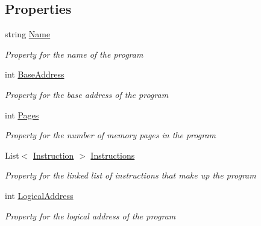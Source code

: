 \subsection*{Properties}
\begin{DoxyCompactItemize}
\item 
string \hyperlink{class_c_p_u___o_s___simulator_1_1_c_p_u_1_1_simulator_program_a29b077a3403773010be9efe912d11b92}{Name}
\begin{DoxyCompactList}\small\item\em Property for the name of the program \end{DoxyCompactList}\item 
int \hyperlink{class_c_p_u___o_s___simulator_1_1_c_p_u_1_1_simulator_program_ad07bee447d47fb07243a4484b5740c21}{Base\+Address}
\begin{DoxyCompactList}\small\item\em Property for the base address of the program \end{DoxyCompactList}\item 
int \hyperlink{class_c_p_u___o_s___simulator_1_1_c_p_u_1_1_simulator_program_aa33b4428956a097dd710948ee51bb5f3}{Pages}
\begin{DoxyCompactList}\small\item\em Property for the number of memory pages in the program \end{DoxyCompactList}\item 
List$<$ \hyperlink{class_c_p_u___o_s___simulator_1_1_c_p_u_1_1_instruction}{Instruction} $>$ \hyperlink{class_c_p_u___o_s___simulator_1_1_c_p_u_1_1_simulator_program_ae64c462081a1806d5f194c271dbb2686}{Instructions}
\begin{DoxyCompactList}\small\item\em Property for the linked list of instructions that make up the program \end{DoxyCompactList}\item 
int \hyperlink{class_c_p_u___o_s___simulator_1_1_c_p_u_1_1_simulator_program_afda25ae1ba65b33787dfc1f9af1c1d8a}{Logical\+Address}
\begin{DoxyCompactList}\small\item\em Property for the logical address of the program \end{DoxyCompactList}\item 

\end{DoxyCompactItemize}
